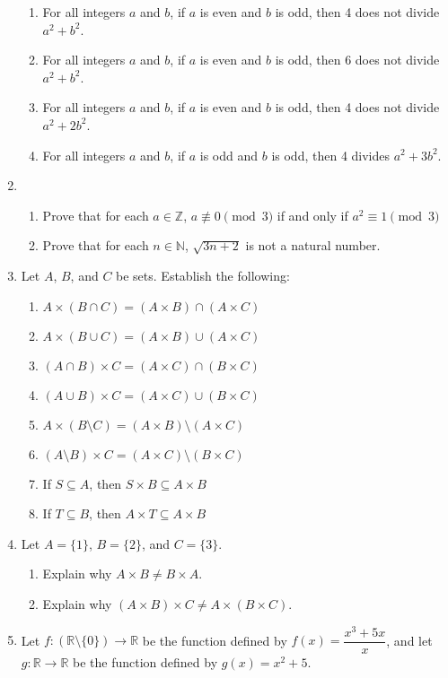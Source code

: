 \documentclass[letterpaper,12pt]{article}
\newcommand{\N}{\mathbb{N}}
\newcommand{\Z}{\mathbb{Z}}
\newcommand{\R}{\mathbb{R}}
\newcommand{\modd}[3]{#1\equiv #2 \pmod{#3}}
\begin{document}
\begin{enumerate}
\begin{enumerate}
 \item For all integers $a$ and $b$, if $a$ is even and $b$ is odd, then 4 does not divide $a^2+b^2$.
 \item For all integers $a$ and $b$, if $a$ is even and $b$ is odd, then 6 does not divide $a^2+b^2$.
 \item For all integers $a$ and $b$, if $a$ is even and $b$ is odd, then 4 does not divide $a^2+2b^2$.
 \item For all integers $a$ and $b$, if $a$ is odd and $b$ is odd, then 4 divides $a^2+3b^2$.
\end{enumerate}
\newpage

\item \begin{enumerate}
 \item Prove that for each $a\in\Z$, $a\not\equiv 0\pmod{3}$ if and only if $\modd{a^2}{1}{3}$
 \item Prove that for each $n\in\N$, $\sqrt{3n+2}$ is not a natural number. 
\end{enumerate}
\item Let $A$, $B$, and $C$ be sets. Establish the following:
\begin{enumerate}
 \item $A\times (B\cap C) = (A\times B)\cap (A\times C)$
 \item $A\times (B\cup C) = (A\times B)\cup (A\times C)$
 \item $(A\cap B)\times C = (A\times C)\cap (B\times C)$
 \item $(A\cup B)\times C = (A\times C)\cup (B\times C)$
 \item $A\times (B\setminus C) = (A\times B)\setminus (A\times C)$
 \item $(A\setminus B)\times C = (A\times C)\setminus (B\times C)$
 \item If $S\subseteq A$, then $S\times B\subseteq A\times B$
 \item If $T\subseteq B$, then $A\times T\subseteq A\times B$
\end{enumerate}
\item Let $A=\{1\}$, $B=\{2\}$, and $C=\{3\}$.
\begin{enumerate}
 \item Explain why $A\times B\neq B\times A$.
 \item Explain why $(A\times B)\times C \neq A\times (B\times C)$.
\end{enumerate}
 \item Let $f:(\R\setminus\{0\})\to \R$ be the function defined by $f(x)=\dfrac{x^3+5x}{x}$, and let $g:\R\to\R$ be the function defined by $g(x)=x^2+5$.

\end{enumerate}
\end{document}
